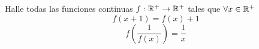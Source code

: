 \begin{problem}
	Halle todas las funciones  continuas $f : \mathbb{R}\textsuperscript{+} \rightarrow \mathbb{R}\textsuperscript{+}$ tales que $\forall x \in \mathbb{R}\textsuperscript{+}$
	\begin{equation}
		f(x+1) = f(x) + 1
	\end{equation}
	\begin{equation}
		f\left(\frac{1}{f(x)}\right) = \frac{1}{x}
	\end{equation}
\end{problem}

